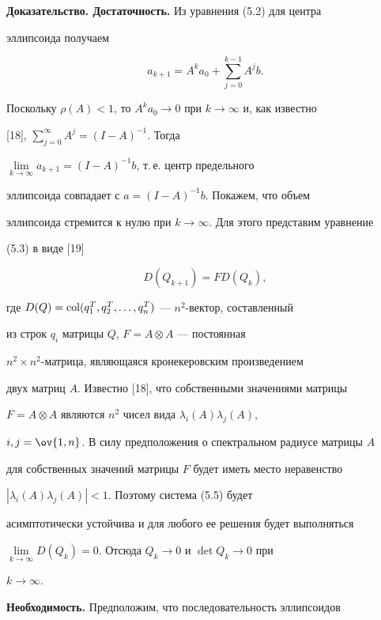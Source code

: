 {\bf Доказательство. Достаточность.} Из уравнения (5.2) для центра


эллипсоида получаем


$$


a_{k+1}=A^k a_0+\sum^{k-1}_{j=0}A^j b.


$$





Поскольку $\rho(A)<1$, то $A^k a_0\to0$ при $k\to\infty$ и, как известно


[18], $\sum\limits^\infty_{j=0}A^j=(I-A)^{-1}$. Тогда


$\lim\limits_{k\to\infty}a_{k+1}=(I-A)^{-1}b$, т.\,е. центр предельного


эллипсоида совпадает с $a=(I-A)^{-1}b$. Покажем, что объем


эллипсоида стремится к нулю при $k\to\infty$. Для этого представим уравнение


(5.3) в виде [19]


\begin{equation}


D(Q_{k+1})=F D(Q_k),


\end{equation}


где $D(Q)=\operatorname{col}(q^T_1,q^T_2,\dotsc,q^T_n)$ --- $n^2$-вектор, составленный


из строк $q_i$ матрицы $Q$, $F=A\otimes A$ --- постоянная


$n^2\times n^2$-матрица, являющаяся кронекеровским произведением


двух матриц $A$. Известно [18], что собственными значениями матрицы


$F=A\otimes A$ являются $n^2$ чисел вида $\lambda_i(A)\lambda_j(A)$,


$i,j=\ov{1,n}$. В силу предположения о спектральном радиусе матрицы $A$


для собственных значений матрицы $F$ будет иметь место неравенство


$|\lambda_i(A)\lambda_j(A)|<1$. Поэтому система (5.5) будет


асимптотически устойчива и для любого ее решения будет выполняться


$\lim\limits_{k\to\infty}D(Q_k)=0$. Отсюда $Q_k\to0$ и $\det Q_k\to0$ при


$k\to\infty$.


\medskip





{\bf Необходимость.} Предположим, что последовательность эллипсоидов


